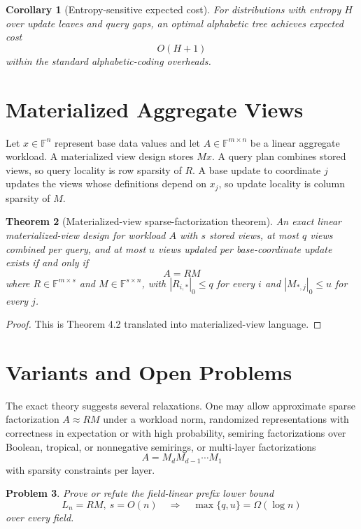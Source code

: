 \documentclass[11pt]{article}
\newtheorem{theorem}{Theorem}[section]
\newtheorem{corollary}[theorem]{Corollary}
\newtheorem{problem}[theorem]{Problem}
\begin{document}
\begin{corollary}[Entropy-sensitive expected cost]
For distributions with entropy $H$ over update leaves and query gaps, an optimal alphabetic tree achieves expected cost
\[
O(H+1)
\]
within the standard alphabetic-coding overheads.
\end{corollary}

\section{Materialized Aggregate Views}

Let $x\in\mathbb F^n$ represent base data values and let $A\in\mathbb F^{m\times n}$ be a linear aggregate workload. A materialized view design stores $Mx$. A query plan combines stored views, so query locality is row sparsity of $R$. A base update to coordinate $j$ updates the views whose definitions depend on $x_j$, so update locality is column sparsity of $M$.

\begin{theorem}[Materialized-view sparse-factorization theorem]
An exact linear materialized-view design for workload $A$ with $s$ stored views, at most $q$ views combined per query, and at most $u$ views updated per base-coordinate update exists if and only if
\[
A=RM
\]
where $R\in\mathbb F^{m\times s}$ and $M\in\mathbb F^{s\times n}$, with $|R_{i,*}|_0\le q$ for every $i$ and $|M_{*,j}|_0\le u$ for every $j$.
\end{theorem}

\begin{proof}
This is Theorem 4.2 translated into materialized-view language.
\end{proof}

\section{Variants and Open Problems}

The exact theory suggests several relaxations. One may allow approximate sparse factorization $A\approx RM$ under a workload norm, randomized representations with correctness in expectation or with high probability, semiring factorizations over Boolean, tropical, or nonnegative semirings, or multi-layer factorizations
\[
A=M_dM_{d-1}\cdots M_1
\]
with sparsity constraints per layer.

\begin{problem}
Prove or refute the field-linear prefix lower bound
\[
L_n=RM,\ s=O(n)
\quad\Longrightarrow\quad
\max\{q,u\}=\Omega(\log n)
\]
over every field.
\end{problem}
\end{document}
